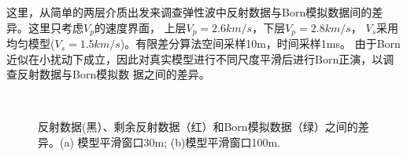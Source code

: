 这里，从简单的两层介质出发来调查弹性波中反射数据与Born模拟数据间的差异。这里只考虑$V_p$的速度界面，
上层$V_p=2.6km/s$，下层$V_p=2.8km/s$， $V_s$采用均匀模型($V_s=1.5km/s$)。有限差分算法空间采样10m，时间采样1ms。
由于Born近似在小扰动下成立，因此对真实模型进行不同尺度平滑后进行Born正演，以调查反射数据与Born模拟数
据之间的差异。
\begin{figure}[!htb]
   \centering
   \\
   \caption{反射数据(黑）、剩余反射数据（红）和Born模拟数据（绿）之间的差异。(a)
   模型平滑窗口30m; (b)模型平滑窗口100m.}
   \label{fig:refl_born_comparison}
\end{figure}
